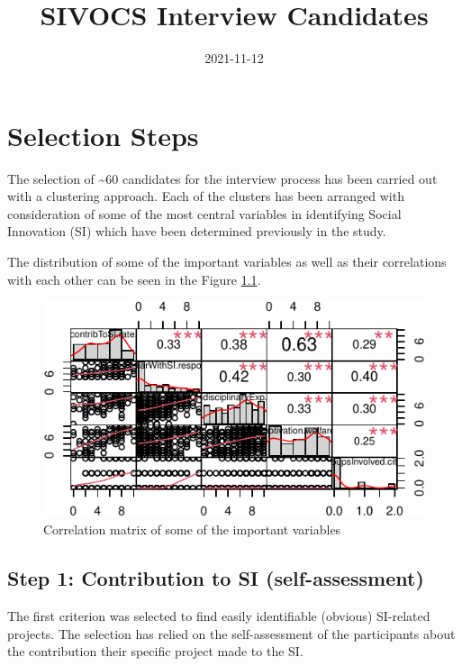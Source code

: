 \documentclass[]{tufte-book}
\title[Selection Criteria]{SIVOCS Interview Candidates}
\date{2021-11-12}
\begin{document}
\maketitle




\hypertarget{selection-steps}{%
\chapter{Selection Steps}\label{selection-steps}}

The selection of \textasciitilde60 candidates for the interview process
has been carried out with a clustering approach. Each of the clusters
has been arranged with consideration of some of the most central
variables in identifying Social Innovation (SI) which have been
determined previously in the study.

The distribution of some of the important variables as well as their
correlations with each other can be seen in the Figure \ref{fig:corr}.

\begin{figure}
    
\includegraphics{SIVOCS_int-cand_files/figure-latex/corr-1}
\caption{Correlation matrix of some of the important variables}
\label{fig:corr}
\end{figure}

\hypertarget{step-1-contribution-to-si-self-assessment}{%
\section{Step 1: Contribution to SI
(self-assessment)}\label{step-1-contribution-to-si-self-assessment}}

The first criterion was selected to find easily identifiable (obvious)
SI-related projects. The selection has relied on the self-assessment of
the participants about the contribution their specific project made to
the SI.
\end{document}
